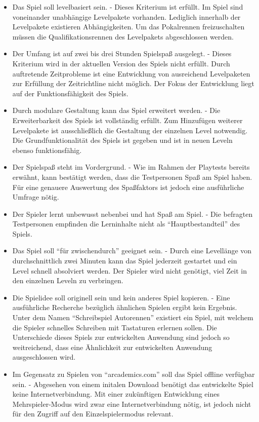 \begin{itemize}
    \item{Das Spiel soll levelbasiert sein. - Dieses Kriterium ist erfüllt. Im Spiel sind voneinander unabhängige Levelpakete vorhanden. Lediglich innerhalb der Levelpakete existieren Abhängigkeiten. Um das Pokalrennen freizuschalten müssen die Qualifikationsrennen des Levelpakets abgeschlossen werden.}
    \item{Der Umfang ist auf zwei bis drei Stunden Spielspaß ausgelegt. - Dieses Kriterium wird in der aktuellen Version des Spiels nicht erfüllt. Durch auftretende Zeitprobleme ist eine Entwicklung von ausreichend Levelpaketen zur Erfüllung der Zeitrichtline nicht möglich. Der Fokus der Entwicklung liegt auf der Funktionsfähigkeit des Spiels.}
    \item{Durch modulare Gestaltung kann das Spiel erweitert werden. - Die Erweiterbarkeit des Spiels ist vollständig erfüllt. Zum Hinzufügen weiterer Levelpakete ist ausschließlich die Gestaltung der einzelnen Level notwendig. Die Grundfunktionalität des Spiels ist gegeben und ist in neuen Leveln ebenso funktionsfähig.}
    \item{Der Spielspaß steht im Vordergrund. - Wie im Rahmen der Playtests bereits erwähnt, kann bestätigt werden, dass die Testpersonen Spaß am Spiel haben. Für eine genauere Auswertung des Spaßfaktors ist jedoch eine ausführliche Umfrage nötig. }
    \item{Der Spieler lernt unbewusst nebenbei und hat Spaß am Spiel. - Die befragten Testpersonen empfinden die Lerninhalte nicht als \enquote{Hauptbestandteil} des Spiels.}
    \item{Das Spiel soll \enquote{für zwischendurch} geeignet sein. - Durch eine Levellänge von durchschnittlich zwei Minuten kann das Spiel jederzeit gestartet und ein Level schnell absolviert werden. Der Spieler wird nicht genötigt, viel Zeit in den einzelnen Leveln zu verbringen.}
    \item{Die Spielidee soll originell sein und kein anderes Spiel kopieren. - Eine ausführliche Recherche bezüglich ähnlichen Spielen ergibt kein Ergebnis. Unter dem Namen \enquote{Schreibspiel Autorennen} existiert ein Spiel, mit welchem die Spieler schnelles Schreiben mit Tastaturen erlernen sollen. Die Unterschiede dieses Spiels zur entwickelten Anwendung sind jedoch so weitreichend, dass eine Ähnlichkeit zur entwickelten Anwendung ausgeschlossen wird.}
    \item{Im Gegensatz zu Spielen von \enquote{arcademics.com} soll das Spiel offline verfügbar sein. - Abgesehen von einem initalen Download benötigt das entwickelte Spiel keine Internetverbindung. Mit einer zukünftigen Entwicklung eines Mehrspieler-Modus wird zwar eine Internetverbindung nötig, ist jedoch nicht für den Zugriff auf den Einzelspielermodus relevant.}

\end{itemize}
